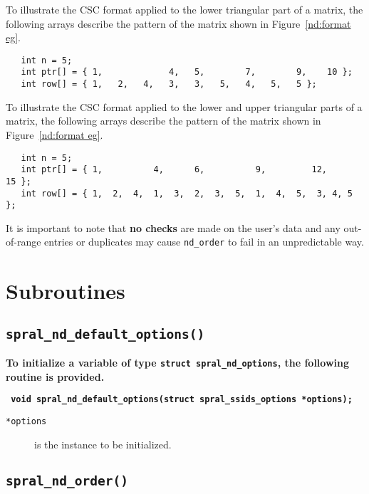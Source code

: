 To illustrate the CSC format applied to the lower triangular part of a matrix, 
the following arrays describe the pattern of the matrix shown in
Figure~\ref{nd:format eg}.
\begin{verbatim}
   int n = 5;
   int ptr[] = { 1,             4,   5,        7,        9,    10 };
   int row[] = { 1,   2,   4,   3,   3,   5,   4,   5,   5 };
\end{verbatim}

To illustrate the CSC format applied to the lower and upper triangular parts of
a matrix, the following arrays describe the pattern of the matrix shown in
Figure~\ref{nd:format eg}.
\begin{verbatim}
   int n = 5;
   int ptr[] = { 1,          4,      6,          9,         12,       15 };
   int row[] = { 1,  2,  4,  1,  3,  2,  3,  5,  1,  4,  5,  3, 4, 5 };
\end{verbatim}


It is important to note
that {\bf no checks} are made on the user's data and any out-of-range entries 
or duplicates may cause {\tt nd\_order} to fail in an unpredictable way. 



\section{Subroutines}

\subsection{\texttt{spral\_nd\_default\_options()}}

\textbf{To initialize a variable of type \texttt{struct spral\_nd\_options},
   the following routine is provided.}

\vspace*{0.1cm}
\noindent
\textbf{\texttt{
      \hspace*{0.3cm} void spral\_nd\_default\_options(struct spral\_ssids\_options *options);
}}

\noindent
\begin{description}
   \item[\texttt{*options}] is the instance to be initialized.
\end{description}

\subsection{{\tt spral\_nd\_order()}}

